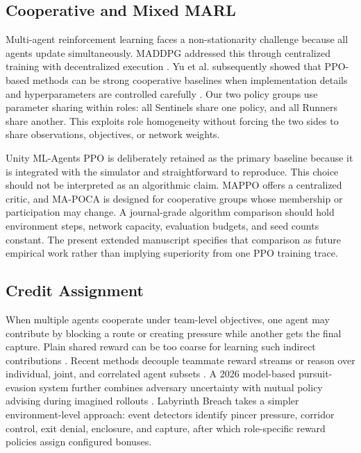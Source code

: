 \documentclass[journal]{IEEEtran}
\begin{document}
\subsection{Cooperative and Mixed MARL}

Multi-agent reinforcement learning faces a non-stationarity challenge because all agents update simultaneously. MADDPG addressed this through centralized training with decentralized execution \cite{lowe2017maddpg}. Yu et al. subsequently showed that PPO-based methods can be strong cooperative baselines when implementation details and hyperparameters are controlled carefully \cite{yu2022mappo}. Our two policy groups use parameter sharing within roles: all Sentinels share one policy, and all Runners share another. This exploits role homogeneity without forcing the two sides to share observations, objectives, or network weights.

Unity ML-Agents PPO is deliberately retained as the primary baseline because it is integrated with the simulator and straightforward to reproduce. This choice should not be interpreted as an algorithmic claim. MAPPO offers a centralized critic, and MA-POCA is designed for cooperative groups whose membership or participation may change. A journal-grade algorithm comparison should hold environment steps, network capacity, evaluation budgets, and seed counts constant. The present extended manuscript specifies that comparison as future empirical work rather than implying superiority from one PPO training trace.

\subsection{Credit Assignment}

When multiple agents cooperate under team-level objectives, one agent may contribute by blocking a route or creating pressure while another gets the final capture. Plain shared reward can be too coarse for learning such indirect contributions \cite{rashid2018qmix,foerster2018coma,wang2020implicit,chen2023explicit}. Recent methods decouple teammate reward streams \cite{kapoor2024} or reason over individual, joint, and correlated agent subsets \cite{zhao2025maca}. A 2026 model-based pursuit-evasion system further combines adversary uncertainty with mutual policy advising during imagined rollouts \cite{zhao2026ma2mb}. Labyrinth Breach takes a simpler environment-level approach: event detectors identify pincer pressure, corridor control, exit denial, enclosure, and capture, after which role-specific reward policies assign configured bonuses.
\end{document}
